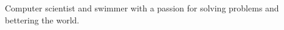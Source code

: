 

\begin{cvparagraph}

Computer scientist and swimmer with a passion for solving problems and bettering the world.
\end{cvparagraph}

